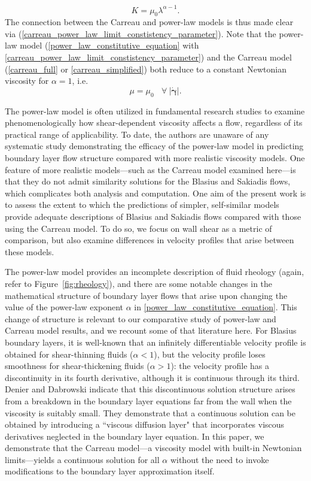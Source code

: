 \documentclass{article}
\newcommand{\gd}{{\dot{\bm{\gamma}}}}
\begin{document}
\begin{subequations}
\begin{equation}
    K = \mu_0 \lambda^{\alpha-1}. \label{carreau_power_law_limit_constistency_parameter}
\end{equation} \end{subequations} The connection between the Carreau and power-law models is thus made clear via (\ref{carreau_power_law_limit_constistency_parameter}). Note that the power-law model (\eqref{power_law_constitutive_equation} with \eqref{carreau_power_law_limit_constistency_parameter}) and the Carreau model (\eqref{carreau_full} or \eqref{carreau_simplified}) both reduce to a constant Newtonian viscosity for $\alpha=1$, i.e. \begin{equation}
    \mu = \mu_0 ~~~~\forall ~ |\gd|. \label{newtonian_viscosity}
\end{equation}

The power-law model is often utilized in fundamental research studies to examine phenomenologically how shear-dependent viscosity affects a flow, regardless of its practical range of applicability.  To date, the authors are unaware of any systematic study demonstrating the efficacy of the power-law model in predicting boundary layer flow structure compared with more realistic viscosity models. One feature of more realistic models---such as the Carreau model examined here---is that they do not admit similarity solutions for the Blasius and Sakiadis flows, which complicates both analysis and computation.  One aim of the present work is to assess the extent to which the predictions of simpler, self-similar models provide adequate descriptions of Blasius and Sakiadis flows compared with those using the Carreau model.  To do so, we focus on wall shear as a metric of comparison, but also examine differences in velocity profiles that arise between these models.

The power-law model provides an incomplete description of fluid rheology (again, refer to Figure~\ref{fig:rheology}), and there are some notable changes in the mathematical structure of boundary layer flows that arise upon changing the value of the power-law exponent $\alpha$ in \eqref{power_law_constitutive_equation}.  This change of structure is relevant to our comparative study of power-law and Carreau model results, and we recount some of that literature here.  For Blasius boundary layers, it is well-known that an infinitely differentiable velocity profile is obtained for shear-thinning fluids ($\alpha < 1$), but the velocity profile loses smoothness for shear-thickening fluids ($\alpha>1$): the velocity profile has a discontinuity in its fourth derivative, although it is continuous through its third.  Denier and Dabrowski \cite{Dabrowski} indicate that this discontinuous solution structure arises from a breakdown in the boundary layer equations far from the wall when the viscosity is suitably small.  They demonstrate that a continuous solution can be obtained by introducing a ``viscous diffusion layer" that incorporates viscous derivatives neglected in the boundary layer equation. In this paper, we demonstrate that the Carreau model---a viscosity model with built-in Newtonian limits---yields a continuous solution for all $\alpha$ without the need to invoke modifications to the boundary layer approximation itself.
\end{document}
